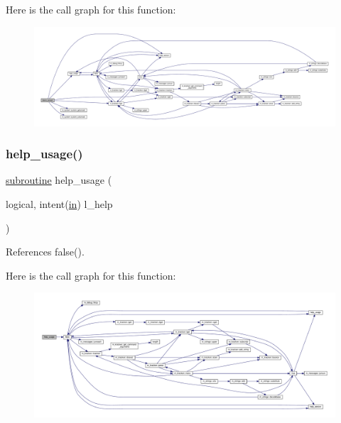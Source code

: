 Here is the call graph for this function\+:
\nopagebreak
\begin{figure}[H]
\begin{center}
\leavevmode
\includegraphics[width=350pt]{__showumask_8f90_a1b5ccb693a5e379113ec98bc98f16a90_cgraph}
\end{center}
\end{figure}
\mbox{\label{__showumask_8f90_a3e09a3b52ee8fb04eeb93fe5761626a8}} 
\subsubsection{\texorpdfstring{help\+\_\+usage()}{help\_usage()}}
{\footnotesize\ttfamily \hyperlink{M__stopwatch_83_8txt_acfbcff50169d691ff02d4a123ed70482}{subroutine} help\+\_\+usage (\begin{DoxyParamCaption}\item[{logical, intent(\hyperlink{M__journal_83_8txt_afce72651d1eed785a2132bee863b2f38}{in})}]{l\+\_\+help }\end{DoxyParamCaption})}



References false().

Here is the call graph for this function\+:
\nopagebreak
\begin{figure}[H]
\begin{center}
\leavevmode
\includegraphics[width=350pt]{__showumask_8f90_a3e09a3b52ee8fb04eeb93fe5761626a8_cgraph}
\end{center}
\end{figure}
\mbox{\label{__showumask_8f90_a39c21619b08a3c22f19e2306efd7f766}} 

